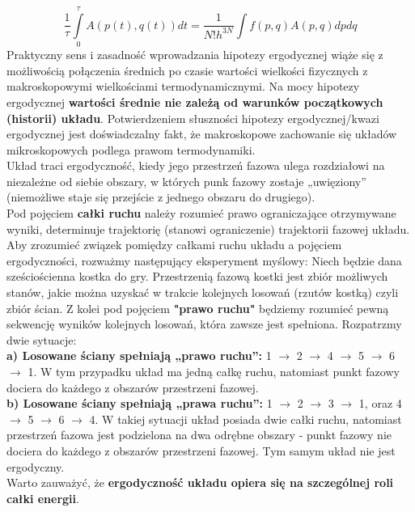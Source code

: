 \documentclass[12pt,a4paper,openright]{report} %
\begin{document}
\begin{equation}
\frac{1}{\tau} \int \limits_{0}^{\tau}A(p(t),q(t))dt=\frac{1}{N!h^{3N}} \int f(p,q)A(p,q)dpdq
\end{equation}
Praktyczny sens i zasadność wprowadzania hipotezy ergodycznej wiąże się z możliwością połączenia średnich po czasie wartości wielkości fizycznych z makroskopowymi wielkościami termodynamicznymi. Na mocy hipotezy ergodycznej \textbf{wartości średnie nie zależą od warunków początkowych (historii) układu}. Potwierdzeniem słuszności hipotezy ergodycznej/kwazi ergodycznej jest doświadczalny fakt, że makroskopowe zachowanie się układów mikroskopowych podlega prawom termodynamiki.\\
Układ traci ergodyczność, kiedy jego przestrzeń fazowa ulega rozdziałowi na niezależne od siebie obszary, w których punk fazowy zostaje „uwięziony” (niemożliwe staje się przejście z jednego obszaru do drugiego).\\
Pod pojęciem \textbf{całki ruchu} należy rozumieć prawo ograniczające otrzymywane wyniki, determinuje trajektorię (stanowi ograniczenie) trajektorii fazowej układu. Aby zrozumieć związek pomiędzy całkami ruchu układu a pojęciem ergodyczności, rozważmy następujący eksperyment myślowy: Niech będzie dana sześciościenna kostka do gry.
Przestrzenią fazową kostki jest zbiór możliwych stanów, jakie można uzyskać w trakcie kolejnych losowań (rzutów kostką) czyli zbiór ścian. Z kolei pod pojęciem \textbf{"prawo ruchu"} będziemy rozumieć pewną sekwencję wyników kolejnych losowań, która zawsze jest spełniona. Rozpatrzmy dwie sytuacje: \\
\textbf{a) Losowane ściany spełniają „prawo ruchu”:} 1 $\rightarrow$ 2 $\rightarrow$ 4 $\rightarrow$ 5 $\rightarrow$ 6 $\rightarrow$ 1. W tym przypadku układ ma jedną całkę ruchu, natomiast punkt fazowy dociera do każdego z obszarów przestrzeni fazowej.\\
\textbf{b) Losowane ściany spełniają „prawa ruchu”:} 1 $\rightarrow$ 2 $\rightarrow$ 3 $\rightarrow$ 1, oraz 4 $\rightarrow$ 5 $\rightarrow$ 6 $\rightarrow$ 4. W takiej sytuacji układ posiada dwie całki ruchu, natomiast przestrzeń fazowa jest podzielona na dwa odrębne obszary - punkt fazowy nie dociera do każdego z obszarów przestrzeni fazowej. Tym samym układ nie jest ergodyczny.\\
Warto zauważyć, że \textbf{ergodyczność układu opiera się na szczególnej roli całki energii}.
\end{document}
